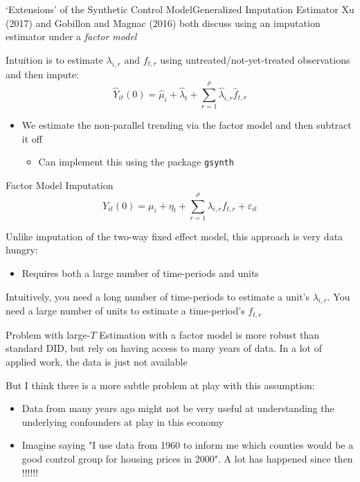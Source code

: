 \documentclass[aspectratio=169,t,11pt,table]{beamer}
\begin{document}
\begin{frame}{`Extensions' of the Synthetic Control Model}{Generalized Imputation Estimator}
  Xu (2017) and Gobillon and Magnac (2016) both discuss using an imputation estimator under a \emph{factor model} 

  \bigskip
  Intuition is to estimate $\lambda_{i,r}$ and $f_{t,r}$ using untreated/not-yet-treated observations and then impute:
  $$
    \hat{Y}_{it}(0) = \hat{\mu}_i + \hat{\lambda}_t + \sum_{r=1}^\rho \hat{\lambda}_{i, r} \hat{f}_{t, r}
  $$
  \begin{itemize}
    \item We estimate the non-parallel trending via the factor model and then subtract it off
    \begin{itemize}
      \item Can implement this using the package \texttt{gsynth}
    \end{itemize}
  \end{itemize}
\end{frame}

\begin{frame}{Factor Model Imputation}
  \vspace*{-\bigskipamount}
  $$
    Y_{it}(0) =  \mu_i + \eta_t + \sum_{r=1}^\rho \lambda_{i, r} f_{t, r} + \varepsilon_{it}
  $$

  \bigskip
  Unlike imputation of the two-way fixed effect model, this approach is very data hungry:
  \begin{itemize}
    \item Requires both a large number of time-periods and units
  \end{itemize}

  \bigskip
  Intuitively, you need a long number of time-periods to estimate a unit's $\lambda_{i,r}$. You need a large number of units to estimate a time-period's $f_{t,r}$
\end{frame}

\begin{frame}{Problem with large-$T$}
  Estimation with a factor model is more robust than standard DID, but rely on having access to many years of data.
  In a lot of applied work, the data is just not available

  \pause
  \bigskip
  But I think there is a more subtle problem at play with this assumption: 
  \begin{itemize}
    \item Data from many years ago might not be very useful at understanding the underlying confounders at play in this economy
    \item Imagine saying "I use data from 1960 to inform me which counties would be a good control group for housing prices in 2000". A lot has happened since then !!!!!!
  \end{itemize}
\end{frame}
\end{document}
